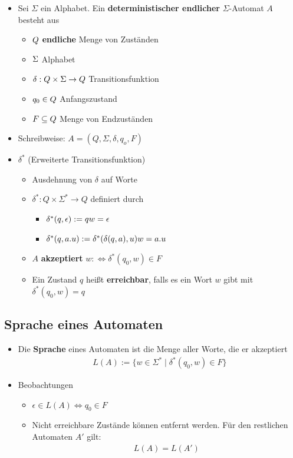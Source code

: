 \documentclass{scrartcl}
\begin{document}
\begin{itemize}
	\item Sei $\Sigma$ ein Alphabet. Ein \textbf{deterministischer endlicher} $\Sigma$-Automat $A$ besteht aus
	\begin{itemize}
		\item $Q \hfill$ \textbf{endliche} Menge von Zuständen
		\item $\Sigma \hfill$ Alphabet
		\item $\delta : Q \times \Sigma \rightarrow Q \hfill$ Transitionsfunktion
		\item $q_0 \in Q \hfill$ Anfangszustand
		\item $F \subseteq Q \hfill$ Menge von Endzuständen
	\end{itemize}
	\item Schreibweise: $A = (Q, \Sigma, \delta, q_o, F)$
	\item $\delta^*$ (Erweiterte Transitionsfunktion)
	\begin{itemize}
		\item Ausdehnung von $\delta$ auf Worte
		\item $\delta^* : Q \times \Sigma^* \rightarrow Q$ definiert durch
		\begin{itemize}
			\item $\delta^*(q,\epsilon) := q \hfill w = \epsilon$
			\item $\delta^*(q,a.u) := \delta^*(\delta(q,a),u) \hfill w=a.u$
		\end{itemize}
		\item $A$ \textbf{akzeptiert} $w :\iff \delta^*(q_0,w) \in F$
		\item Ein Zustand $q$ heißt \textbf{erreichbar}, falls es ein Wort $w$ gibt mit $\delta^*(q_0,w) = q$
	\end{itemize}
\end{itemize}

\subsection{Sprache eines Automaten}

\begin{itemize}
	\item Die \textbf{Sprache} eines Automaten ist die Menge aller Worte, die er akzeptiert
	\begin{align*}
		L(A) := \{ w \in \Sigma^* \mid \delta^*(q_0,w) \in F \}
	\end{align*}
	\item Beobachtungen
	\begin{itemize}
		\item $\epsilon \in L(A) \iff q_0 \in F$
		\item Nicht erreichbare Zustände können entfernt werden. Für den restlichen Automaten $A'$ gilt:
		\begin{align*}
			L(A) = L(A')
		\end{align*}
	\end{itemize}
\end{itemize}
\end{document}
